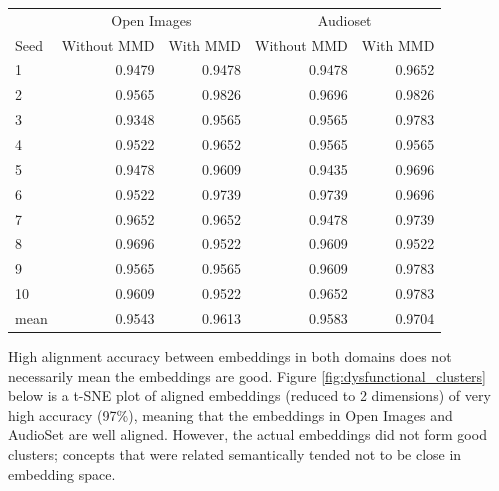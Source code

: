 \begin{table}[H]
\centering
\begin{tabular}{lrrrr}
  \toprule
 \multicolumn{1}{c}{} & \multicolumn{2}{c}{Open Images} & \multicolumn{2}{c}{Audioset} \\
 \cmidrule(lr){2-3} \cmidrule(lr){4-5}
{Seed} &    Without MMD &   With MMD   &  Without MMD &   With MMD \\
\midrule
1    &       0.9479 &        0.9478&    0.9478 &  0.9652  \\
2    &       0.9565 &        0.9826&    0.9696 &  0.9826  \\
3    &       0.9348 &        0.9565&    0.9565 &  0.9783  \\
4    &       0.9522 &        0.9652&    0.9565 &  0.9565  \\
5    &       0.9478 &        0.9609&    0.9435 &  0.9696  \\
6    &       0.9522 &        0.9739&    0.9739 &  0.9696  \\
7    &       0.9652 &        0.9652&    0.9478 &  0.9739  \\
8    &       0.9696 &        0.9522&    0.9609 &  0.9522  \\
9    &       0.9565 &        0.9565&    0.9609 &  0.9783  \\
10   &       0.9609 &        0.9522&    0.9652 &  0.9783  \\
\midrule                                                         
mean &       0.9543 &        0.9613 &   0.9583 &  0.9704  \\
\bottomrule
\end{tabular}
\end{table}

High alignment accuracy between embeddings in both domains does not necessarily mean the embeddings are good. Figure \ref{fig:dysfunctional_clusters} below is a t-SNE plot of aligned embeddings (reduced to 2 dimensions) of very high accuracy (97\%), meaning that the embeddings in Open Images and AudioSet are well aligned. However, the actual embeddings did not form good clusters; concepts that were related semantically tended not to be close in embedding space. 

